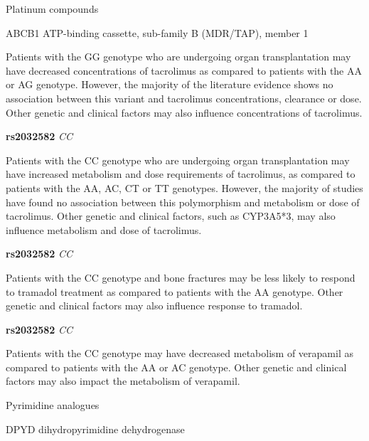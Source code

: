 \documentclass{resume} %
\begin{document}
\begin{rSection}{ Platinum compounds }
\begin{rSubsection}{ ABCB1 }{ ATP-binding cassette, sub-family B (MDR/TAP), member 1 }{}{}
\item[] Patients with the GG genotype who are undergoing organ transplantation may have decreased concentrations of tacrolimus as compared to patients with the AA or AG genotype. However, the majority of the literature evidence shows no association between this variant and tacrolimus concentrations, clearance or dose. Other genetic and clinical factors may also influence concentrations of tacrolimus. \item \textbf{ rs2032582 } \textit{ CC }
\item[] Patients with the CC genotype who are undergoing organ transplantation may have increased metabolism and dose requirements of tacrolimus, as compared to patients with the AA, AC, CT or TT genotypes. However, the majority of studies have found no association between this polymorphism and metabolism or dose of tacrolimus. Other genetic and clinical factors, such as CYP3A5*3, may also influence metabolism and dose of tacrolimus.\item \textbf{ rs2032582 } \textit{ CC }
\item[] Patients with the CC genotype and bone fractures may be less likely to respond to tramadol treatment as compared to patients with the AA genotype. Other genetic and clinical factors may also influence response to tramadol. \item \textbf{ rs2032582 } \textit{ CC }
\item[] Patients with the CC genotype may have decreased metabolism of verapamil as compared to patients with the AA or AC genotype. Other genetic and clinical factors may also impact the metabolism of verapamil.
\end{rSubsection}

\end{rSection}\begin{rSection}{ Pyrimidine analogues }
\item[]

\begin{rSubsection}{ DPYD }{ dihydropyrimidine dehydrogenase }{}{}
\item[]


\end{rSubsection}
\end{rSection}
\end{document}
